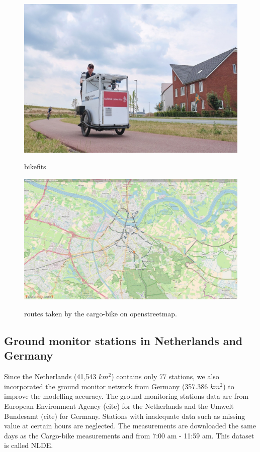 \documentclass{article}
\begin{document}
\begin{figure}[H]
    \includegraphics[width=\linewidth]{f1a.jpg}
    \label{bike}
    \caption {bikefits}
\end{figure}
\begin{figure}
    \includegraphics[width=\linewidth]{f1b.jpg}
    \label{route}
    \caption {routes taken by the cargo-bike on openstreetmap\citep{openstreetmap}.}
\end{figure}

\subsection{Ground monitor stations in Netherlands and Germany}

Since the Netherlands (41,543 $km^2$) contains only 77 stations, we also incorporated the ground monitor network from Germany (357.386 $km^2$) to improve the modelling accuracy. The ground monitoring stations data are from European Environment Agency (cite) for the Netherlands and the Umwelt Bundesamt (cite) for Germany. Stations with inadequate data such as missing value at certain hours are neglected. The measurements are downloaded the same days as the Cargo-bike measurements and from 7:00 am - 11:59 am. This dataset is called NLDE.
\end{document}
